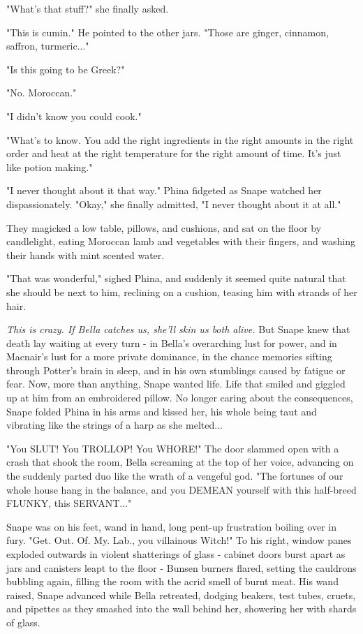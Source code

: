 \documentclass[a4paper,11pt]{article}
\begin{document}
"What's that stuff?" she finally asked.

"This is cumin." He pointed to the other jars. "Those are ginger, cinnamon, saffron, turmeric..."

"Is this going to be Greek?"

"No. Moroccan."

"I didn't know you could cook."

"What's to know. You add the right ingredients in the right amounts in the right order and heat at the right temperature for the right amount of time. It's just like potion making."

"I never thought about it that way." Phina fidgeted as Snape watched her dispassionately. "Okay," she finally admitted, "I never thought about it at all."

They magicked a low table, pillows, and cushions, and sat on the floor by candlelight, eating Moroccan lamb and vegetables with their fingers, and washing their hands with mint scented water.

"That was wonderful," sighed Phina, and suddenly it seemed quite natural that she should be next to him, reclining on a cushion, teasing him with strands of her hair.

\emph{This is crazy. If Bella catches us, she'll skin us both alive.} But Snape knew that death lay waiting at every turn - in Bella's overarching lust for power, and in Macnair's lust for a more private dominance, in the chance memories sifting through Potter's brain in sleep, and in his own stumblings caused by fatigue or fear. Now, more than anything, Snape wanted life. Life that smiled and giggled up at him from an embroidered pillow. No longer caring about the consequences, Snape folded Phina in his arms and kissed her, his whole being taut and vibrating like the strings of a harp as she melted...

"You SLUT! You TROLLOP! You WHORE!" The door slammed open with a crash that shook the room, Bella screaming at the top of her voice, advancing on the suddenly parted duo like the wrath of a vengeful god. "The fortunes of our whole house hang in the balance, and you DEMEAN yourself with this half-breed FLUNKY, this SERVANT..."

Snape was on his feet, wand in hand, long pent-up frustration boiling over in fury. "Get. Out. Of. My. Lab., you villainous Witch!" To his right, window panes exploded outwards in violent shatterings of glass - cabinet doors burst apart as jars and canisters leapt to the floor - Bunsen burners flared, setting the cauldrons bubbling again, filling the room with the acrid smell of burnt meat. His wand raised, Snape advanced while Bella retreated, dodging beakers, test tubes, cruets, and pipettes as they smashed into the wall behind her, showering her with shards of glass.
\end{document}
